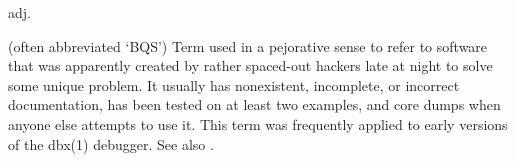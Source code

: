  adj.

(often abbreviated `BQS') Term used in a pejorative sense to refer to software
that was apparently created by rather spaced-out hackers late at night to solve
some unique problem. It usually has nonexistent, incomplete, or incorrect
documentation, has been tested on at least two examples, and core dumps when
anyone else attempts to use it. This term was frequently applied to early
versions of the dbx(1) debugger. See also .

